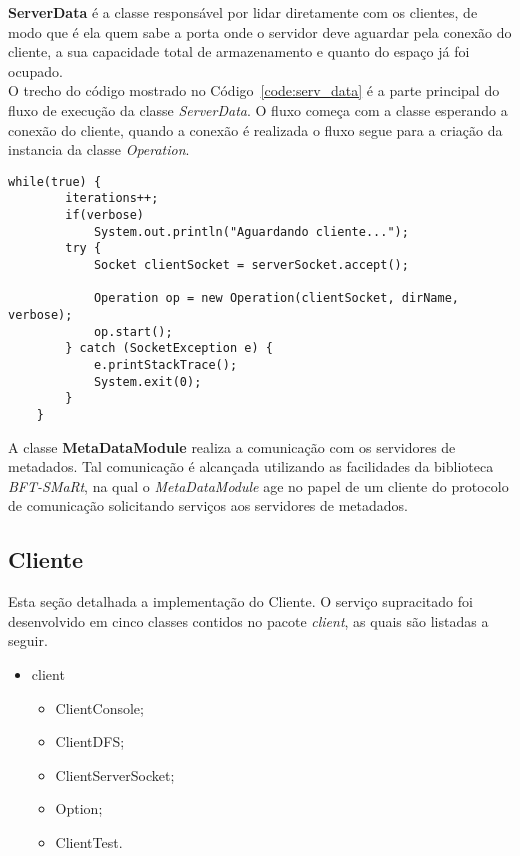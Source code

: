 \textbf{ServerData} é a classe responsável por lidar diretamente com os clientes, de modo que é ela quem sabe a porta onde o servidor deve aguardar pela conexão do cliente, a sua capacidade total de armazenamento e quanto do espaço já foi ocupado.
\\

O trecho do código mostrado no Código~\ref{code:serv_data} é a parte principal do fluxo de execução da classe \textit{ServerData}. O fluxo começa com a classe esperando a conexão do cliente, quando a conexão é realizada o fluxo segue para a criação da instancia da classe \textit{Operation}.
\\

\begin{lstlisting}[basicstyle=\ttfamily\footnotesize, frame=single, caption=Declaração e o método de execução da classe Operation, label=code:serv_data]		
	while(true) {
		iterations++;
		if(verbose)
			System.out.println("Aguardando cliente...");
		try {
			Socket clientSocket = serverSocket.accept();
			
			Operation op = new Operation(clientSocket, dirName, verbose);
			op.start();
		} catch (SocketException e) {
			e.printStackTrace();
			System.exit(0);
		}
	}
\end{lstlisting}

A classe \textbf{MetaDataModule} realiza a comunicação com os servidores de metadados. Tal comunicação é alcançada utilizando as facilidades da biblioteca \textit{BFT-SMaRt}, na qual o \textit{MetaDataModule} age no papel de um cliente do protocolo de comunicação solicitando serviços aos servidores de metadados.
\\

\subsection{Cliente}
Esta seção detalhada a implementação do Cliente. O serviço supracitado foi desenvolvido em cinco classes contidos no pacote \textit{client}, as quais são listadas a seguir.
\\

\begin{itemize}
	\item client
	\begin{itemize}
	\item ClientConsole;
	\item ClientDFS;
	\item ClientServerSocket;
	\item Option;
	\item ClientTest.
	\end{itemize}
\end{itemize}

